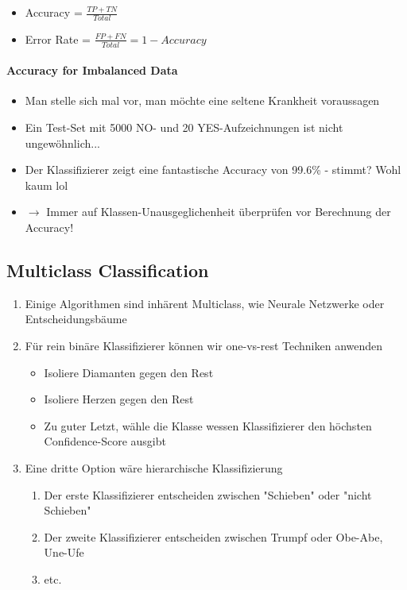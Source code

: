 \documentclass[a4paper]{article}
\begin{document}
		\begin{itemize}
			\item Accuracy = $\frac{TP + TN}{Total}$\\
			
			\item Error Rate = $\frac{FP + FN}{Total} = 1 - Accuracy$
		\end{itemize}
	
		\paragraph{Accuracy for Imbalanced Data}
		
		\begin{itemize}
			\item Man stelle sich mal vor, man möchte eine seltene Krankheit voraussagen
			\item Ein Test-Set mit 5000 NO- und 20 YES-Aufzeichnungen ist nicht ungewöhnlich...
			\item Der Klassifizierer zeigt eine fantastische Accuracy von 99.6\% - stimmt? Wohl kaum lol
			\item $\rightarrow$ Immer auf Klassen-Unausgeglichenheit überprüfen vor Berechnung der Accuracy!
		\end{itemize}
	
		\newpage
		
		\subsection{Multiclass Classification}
		
		\begin{enumerate}
			\item Einige Algorithmen sind inhärent Multiclass, wie Neurale Netzwerke oder Entscheidungsbäume
			\item Für rein binäre Klassifizierer können wir one-vs-rest Techniken anwenden
				\begin{itemize}
					\item Isoliere Diamanten gegen den Rest
					\item Isoliere Herzen gegen den Rest
					\item Zu guter Letzt, wähle die Klasse wessen Klassifizierer den höchsten Confidence-Score ausgibt
				\end{itemize}
			\item Eine dritte Option wäre hierarchische Klassifizierung
				\begin{enumerate}
					\item Der erste Klassifizierer entscheiden zwischen "Schieben" oder "nicht Schieben"
					\item Der zweite Klassifizierer entscheiden zwischen Trumpf oder {Obe-Abe, Une-Ufe}
					\item etc.
				\end{enumerate}
		\end{enumerate}
	
\end{document}
